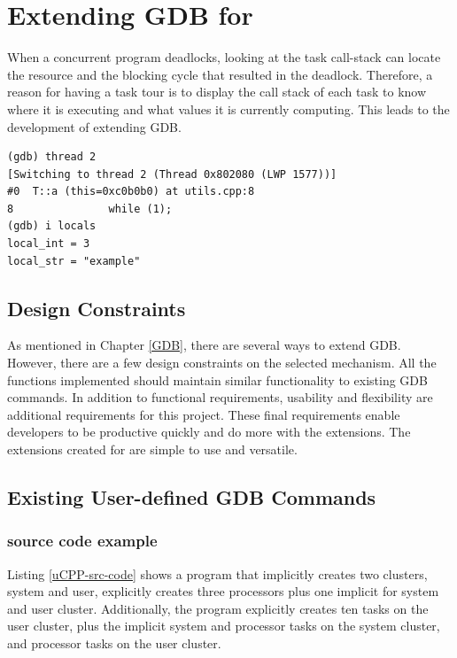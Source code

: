 \chapter{Extending GDB for \uCPP}
When a concurrent program deadlocks, looking at the task call-stack can locate
the resource and the blocking cycle that resulted in the deadlock. Therefore,
a reason for having a task tour is to display the call stack of each task to
know where it is executing and what values it is currently computing. This leads
to the development of extending GDB.
\begin{lstlisting}[caption={Call stack of function \textbf{a()} in the \uCPPS program from listing
\ref{uCPP-src-code}}]
(gdb) thread 2
[Switching to thread 2 (Thread 0x802080 (LWP 1577))]
#0  T::a (this=0xc0b0b0) at utils.cpp:8
8               while (1);
(gdb) i locals
local_int = 3
local_str = "example"
\end{lstlisting}
\section{Design Constraints}
As mentioned in Chapter \ref{GDB}, there are several ways to extend GDB. However,
there are a few design constraints on the selected mechanism. All the functions
implemented should maintain similar functionality to existing GDB commands. In addition to functional
requirements, usability and flexibility are additional requirements for this
project. These final requirements enable developers to be productive quickly
and do more with the extensions. The extensions created for \uCPPS are simple
to use and versatile.

\section{Existing User-defined GDB Commands}
\subsection{\uCPPS source code example}
Listing \ref{uCPP-src-code} shows a \uCPPS program that implicitly creates two
clusters, system and user, explicitly creates three processors plus one
implicit for system and user cluster. Additionally, the program explicitly creates ten tasks on the
user cluster, plus the implicit system and processor tasks on the system cluster, and
processor tasks on the user cluster.

